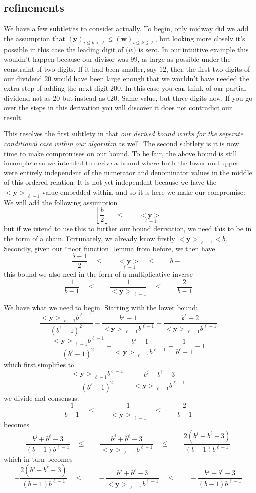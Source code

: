 \documentclass[twoside]{article}
\renewcommand{\leq}{\ensuremath{\quad\le\qquad}}
\newcommand{\bseq}[1][u]{\ensuremath{<\!\!\bm{#1}\!\!>}}
\newcommand{\bunderseq}[2][u]{\ensuremath{\underset{#2}{<\!\!\bm{#1}\!\!>}}}
\newcommand{\numer}[3][w]{\ensuremath{(\bm{#1})_{#2\le k\le #3}}}
\newcommand{\denom}[3][y]{\ensuremath{(\bm{#1})_{#2\le k <  #3}}}
\begin{document}
\subsection*{refinements}

We have a few subtleties to consider actually. To begin, only midway did we add the assumption that
$ \denom{i}{\ell}\le\numer{i}{\ell} $, but looking more closely it's possible in this case the leading digit of $ \bm(w) $ is zero.
In our intuitive example this wouldn't happen because our divisor was $ 99 $, as large as possible under the constraint of two digits.
If it had been smaller, say $ 12 $, then the first two digits of our dividend $ 20 $ would have been large enough that we wouldn't
have needed the extra step of adding the next digit $ 200 $. In this case you can think of our partial dividend not as $ 20 $ but
instead as $ 020 $. Same value, but three digits now. If you go over the steps in this derivation you will discover it does not
contradict our result.

This resolves the first subtlety in that \emph{our derived bound works for the seperate conditional case within our algorithm} as well.
The second subtlety is it is now time to make compromises on our bound. To be fair, the above bound is still incomplete as we intended
to derive a bound where both the lower and upper were entirely independent of the numerator and denominator values in the middle of
this ordered relation. It is not yet independent because we have the $ \bseq[y]_{\ell-1} $ value embedded within, and so it is here
we make our compromise: We will add the following assumption
$$ \left\lfloor\frac{b}{2}\right\rfloor\leq\bunderseq[y]{\ell-1} $$
but if we intend to use this to further our bound derivation, we need this to be in the form of a chain. Fortunately, we already
know firstly $ \bseq[y]_{\ell-1} < b $. Secondly, given our ``floor function'' lemma from before, we then have
$$ \frac{b-1}{2}\leq\bunderseq[y]{\ell-1}\leq b-1 $$
this bound we also need in the form of a multiplicative inverse
$$ \frac{1}{b-1}\leq\frac{1}{\bseq[y]_{\ell-1}}\leq\frac{2}{b-1} $$

We have what we need to begin. Starting with the lower bound:
$$ \frac{\bseq[y]_{\ell-1}b^{\ell-1}}{(b^\ell-1)^2}-\frac{b^j-1}{\bseq[y]_{\ell-1}b^{\ell-1}}-\frac{b^\ell-2}{\bseq[y]_{\ell-1}b^{\ell-1}} $$
$$ \frac{\bseq[y]_{\ell-1}b^{\ell-1}}{(b^\ell-1)^2}-\frac{b^j-1}{\bseq[y]_{\ell-1}b^{\ell-1}}+\frac{1}{b^\ell-1}-1 $$
which first simplifies to
$$ \frac{\bseq[y]_{\ell-1}b^{\ell-1}}{(b^\ell-1)^2}-\frac{b^j+b^\ell-3}{\bseq[y]_{\ell-1}b^{\ell-1}} $$
we divide and consensus:
$$ \frac{1}{b-1}\leq\frac{1}{\bseq[y]_{\ell-1}}\leq\frac{2}{b-1} $$
becomes
$$ \frac{b^j+b^\ell-3}{(b-1)b^{\ell-1}}
	\leq\frac{b^j+b^\ell-3}{\bseq[y]_{\ell-1}b^{\ell-1}}
	\leq\frac{2(b^j+b^\ell-3)}{(b-1)b^{\ell-1}} $$
which in turn becomes
$$ -\frac{2(b^j+b^\ell-3)}{(b-1)b^{\ell-1}}
	\leq-\frac{b^j+b^\ell-3}{\bseq[y]_{\ell-1}b^{\ell-1}}
	\leq-\frac{b^j+b^\ell-3}{(b-1)b^{\ell-1}} $$
\end{document}
